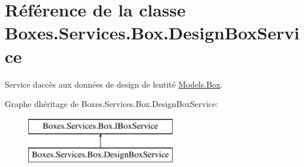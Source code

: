 \hypertarget{class_boxes_1_1_services_1_1_box_1_1_design_box_service}{}\section{Référence de la classe Boxes.\+Services.\+Box.\+Design\+Box\+Service}
\label{class_boxes_1_1_services_1_1_box_1_1_design_box_service}


Service d\textquotesingle{}accès aux données de design de l\textquotesingle{}entité \hyperlink{class_boxes_1_1_models_1_1_box}{Models.\+Box}.  


Graphe d\textquotesingle{}héritage de Boxes.\+Services.\+Box.\+Design\+Box\+Service\+:\begin{figure}[H]
\begin{center}
\leavevmode
\includegraphics[height=2.000000cm]{class_boxes_1_1_services_1_1_box_1_1_design_box_service}
\end{center}
\end{figure}
